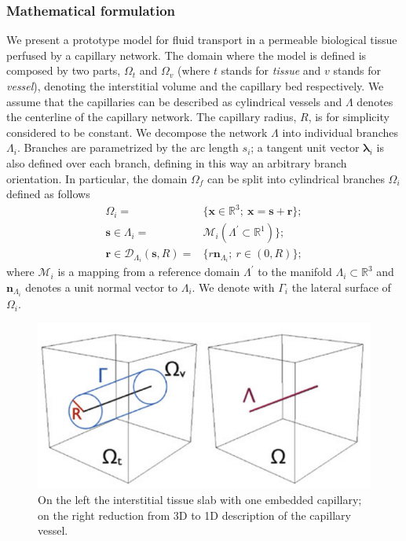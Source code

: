 \documentclass[10pt]{article} %
\def\R{\mathbb{R}}
\def\xx{\boldsymbol x}
\def\rr{\boldsymbol r}
\def\ss{\boldsymbol s}
\def\nn{\boldsymbol n}
\begin{document}
	\subsubsection{Mathematical formulation}
	We present a prototype model for fluid transport in a permeable biological tissue perfused by a capillary network. 
	The domain where the model is defined is composed by two parts, $\Omega_t$ and $\Omega_v$ (where $t$ stands for \textit{tissue} and $v$ stands for \textit{vessel}), denoting the interstitial volume and the capillary bed respectively.
	We assume that the capillaries can be described as cylindrical vessels and  $\Lambda$ denotes the centerline of the capillary network. The capillary radius, $R$, is for simplicity considered to be constant.  We decompose the network $\Lambda$ into individual branches $\Lambda_i$. Branches are parametrized by the arc length $s_i$; a tangent unit vector $\boldsymbol \lambda_i$ is also defined over each branch, defining in this way an arbitrary branch orientation. In particular, the domain $\Omega_f$ can be split into cylindrical branches $\Omega_i$ defined as follows
	\begin{align*}
	\Omega_i = & \{ \xx \in \R^3; \ \xx = \ss + \rr\}; \\
	\ss \in \Lambda_i = & \mathcal{M}_i(\Lambda^\prime \subset \R^1)\}; \\
	\rr \in \mathcal{D}_{\Lambda_i}(\ss,R) = & \{ r \nn_{\Lambda_i}; \ r\in(0,R)\};
	\end{align*}
	where $\mathcal{M}_i$ is a mapping from a reference domain $\Lambda^\prime$ to the manifold $\Lambda_i \subset \R^3$ and $\nn_{\Lambda_i}$ denotes a unit normal vector to $\Lambda_i$. We denote with $\Gamma_i$ the lateral surface of $\Omega_i$. 
	
	\begin{figure}
		\centering
		\includegraphics[width=0.7\linewidth]{"3d-1d domain"}
		\caption[Fig. 1]{On the left the interstitial tissue slab with one embedded capillary; on the right reduction from 3D to 1D description of the capillary vessel.}
		\label{fig:3d-1d-domain}
	\end{figure}	
	
\end{document}

